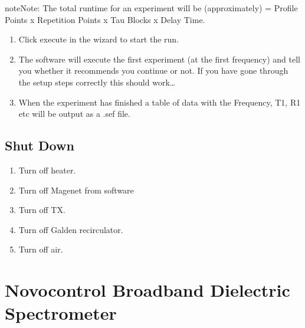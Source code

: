 \documentclass[letterpaper,10pt,english]{sphinxmanual}
\begin{document}
\begin{sphinxadmonition}{note}{Note:}
\sphinxAtStartPar
The total run\sphinxhyphen{}time for an experiment will be (approximately) = Profile Points x Repetition Points x Tau Blocks x Delay Time.
\end{sphinxadmonition}
\begin{enumerate}
%
\setcounter{enumi}{4}
\item {} 
\sphinxAtStartPar
Click execute in the wizard to start the run.

\item {} 
\sphinxAtStartPar
The software will execute the first experiment (at the first frequency) and tell you whether it recommends you continue or not. If you have gone through the setup steps correctly this should work…

\item {} 
\sphinxAtStartPar
When the experiment has finished a table of data with the Frequency, T1, R1 etc will be output as a .sef file.

\end{enumerate}


\section{Shut Down}
\label{\detokenize{stelar-ffc:shut-down}}\begin{enumerate}
%
\item {} 
\sphinxAtStartPar
Turn off heater.

\item {} 
\sphinxAtStartPar
Turn off Magenet from software

\item {} 
\sphinxAtStartPar
Turn off TX.

\item {} 
\sphinxAtStartPar
Turn off Galden recirculator.

\item {} 
\sphinxAtStartPar
Turn off air.

\end{enumerate}


\chapter{Novocontrol Broadband Dielectric Spectrometer}
\label{\detokenize{novocontrol-dielectric:novocontrol-broadband-dielectric-spectrometer}}\label{\detokenize{novocontrol-dielectric::doc}}
\end{document}
